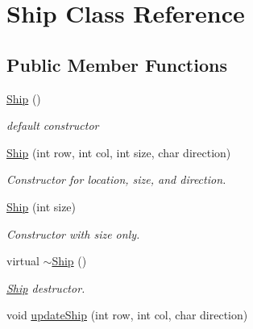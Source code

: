 \hypertarget{classShip}{}\section{Ship Class Reference}
\label{classShip}
\subsection*{Public Member Functions}
\begin{DoxyCompactItemize}
\item 
\mbox{\label{classShip_ab7608fcfc4d27c678aacaf9bfd68a462}} 
\mbox{\hyperlink{classShip_ab7608fcfc4d27c678aacaf9bfd68a462}{Ship}} ()
\begin{DoxyCompactList}\small\item\em default constructor \end{DoxyCompactList}\item 
\mbox{\label{classShip_aaad5edb1bf677967600eeb110d7f5bd7}} 
\mbox{\hyperlink{classShip_aaad5edb1bf677967600eeb110d7f5bd7}{Ship}} (int row, int col, int size, char direction)
\begin{DoxyCompactList}\small\item\em Constructor for location, size, and direction. \end{DoxyCompactList}\item 
\mbox{\label{classShip_ab07f0085e1d727ccebf315f69d6956cc}} 
\mbox{\hyperlink{classShip_ab07f0085e1d727ccebf315f69d6956cc}{Ship}} (int size)
\begin{DoxyCompactList}\small\item\em Constructor with size only. \end{DoxyCompactList}\item 
\mbox{\label{classShip_adc6a4b80ad5e15053031b90cca25342c}} 
virtual \mbox{\hyperlink{classShip_adc6a4b80ad5e15053031b90cca25342c}{$\sim$\+Ship}} ()
\begin{DoxyCompactList}\small\item\em \mbox{\hyperlink{classShip}{Ship}} destructor. \end{DoxyCompactList}\item 
\mbox{\label{classShip_a11c36c52fc8191d7aafccf6f41655748}} 
void \mbox{\hyperlink{classShip_a11c36c52fc8191d7aafccf6f41655748}{update\+Ship}} (int row, int col, char direction)

\end{DoxyCompactItemize}
